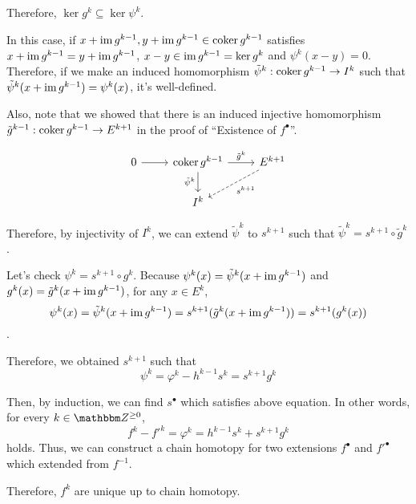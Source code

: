 Therefore, \(\ker g^k \subseteq \ker \psi^k\).

In this case, if \(x + \textnormal{im}\, g^{k - 1}, y + \textnormal{im}\, g^{k - 1} \in \textnormal{coker}\, g^{k - 1}\) satisfies
\(x + \textnormal{im}\, g^{k - 1} = y + \textnormal{im}\, g^{k - 1}\),
\(x - y \in \textnormal{im}\, g^{k - 1} = \ker g^k\) and \(\psi^k(x - y) = 0\).
Therefore, if we make an induced homomorphism \(\tilde \psi^k: \textnormal{coker}\, g^{k - 1} \to I^k\)
such that \(\tilde \psi^{k}(x + \textnormal{im}\, g^{k - 1}) = \psi^k(x)\),
it's well-defined.

Also, note that we showed that there is
an induced injective homomorphism \(\tilde g^{k - 1}: \textnormal{coker}\, g^{k - 1} \to E^{k + 1}\)
in the proof of ``Existence of \(f^\bullet\)''.

\[\begin{tikzcd}
  0 \ar{r} & \coker g^{k - 1} \ar[swap, "\tilde \psi^k"]{d} \ar["\tilde g^{k}"]{r} & E^{k + 1} \ar[dashed, "s^{k + 1}"]{ld} \\
  & I^{k} & 
\end{tikzcd}\]

Therefore, by injectivity of \(I^k\),
we can extend \(\tilde \psi^{k}\) to \(s^{k + 1}\) such that \(\tilde \psi^{k} = s^{k + 1} \circ \tilde g^{k}\).

Let's check \(\psi^k = s^{k + 1} \circ g^k\).
Because \(\psi^k(x) = \tilde \psi^k(x + \textnormal{im}\, g^{k - 1})\) and \(g^k(x) = \tilde g^k(x + \textnormal{im}\, g^{k - 1})\), for any \(x \in E^k\),
\[\psi^k(x) = \tilde\psi^k(x + \textnormal{im}\, g^{k - 1}) = s^{k + 1}(\tilde g^k(x + \textnormal{im}\, g^{k - 1})) = s^{k + 1}(g^k(x))\].

Therefore, we obtained \(s^{k + 1}\) such that
\[\psi^k = \varphi^k - h^{k - 1}s^k = s^{k + 1}g^k\]

Then, by induction, we can find \(s^\bullet\) which satisfies above equation.
In other words, for every \(k \in \bbZ^{\ge 0}\),
\[f^k - f'^k = \varphi^k = h^{k - 1}s^k + s^{k + 1}g^k\]
holds.
Thus, we can construct a chain homotopy for two extensions \(f^\bullet\) and \(f'^\bullet\) which extended from \(f^{-1}\).

Therefore, \(f^k\) are unique up to chain homotopy.
\qedsq